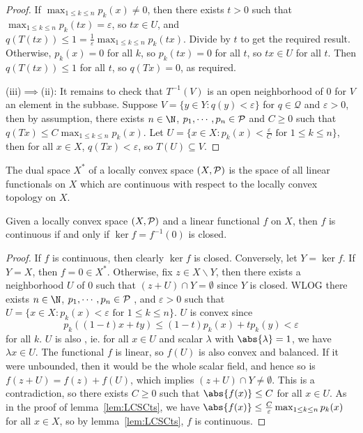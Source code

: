 \documentclass[a4paper]{article}
\begin{document}
{\begin{proof}
  If $\max_{1\leq k\leq n}p_k(x)\not= 0$, then there exists $t>0$ such that $\max_{1\leq k\leq n}p_k(tx)=\varepsilon$, so $tx\in U$, and $q(T(tx))\leq 1=\frac{1}{\varepsilon}\max_{1\leq k\leq n}p_k(tx)$. Divide by $t$ to get the required result. Otherwise, $p_k(x)=0$ for all $k$, so $p_k(tx)=0$ for all $t$, so $tx\in U$ for all $t$. Then $q(T(tx))\leq 1$ for all $t$, so $q(Tx)=0$, as required.

  (iii)$\implies$(ii): It remains to check that $T^{-1}(V)$ is an open neighborhood of 0 for $V$ an element in the subbase. Suppose $V=\{y\in Y: q(y)<\varepsilon\}$ for $q\in\mathcal{Q}$ and $\varepsilon>0$, then by assumption, there exists $n\in\N$, $p_1,\cdots,p_n\in\P$ and $C\geq 0$ such that $q(Tx)\leq C\max_{1\leq k\leq n}p_k(x)$. Let $U=\{x\in X:p_k(x)<\frac{\varepsilon}{C}\text{ for }1\leq k\leq n\}$, then for all $x\in X$, $q(Tx)<\varepsilon$, so $T(U)\subseteq V$.
\end{proof}

The dual space $X^*$ of a locally convex space $(X,\P)$ is the space of all linear functionals on $X$ which are continuous with respect to the locally convex topology on $X$.

\begin{ncor}\label{cor:KernelClosed}
  Given a locally convex space $(X,\P)$ and a linear functional $f$ on $X$, then $f$ is continuous if and only if $\ker f=f^{-1}(0)$ is closed.
\end{ncor}

\begin{proof}
	If $f$ is continuous, then clearly $\ker f$ is closed. Conversely, let $Y=\ker f$. If $Y=X$, then $f=0\in X^*$. Otherwise, fix $z\in X\backslash Y$, then there exists a neighborhood $U$ of 0 such that $(z+U)\cap Y=\emptyset$ since $Y$ is closed. WLOG there exists $n\in\N$, $p_1,\cdots,p_n\in\P$ , and $\varepsilon>0$ such that $U=\{x\in X:p_k(x)<\varepsilon\text{ for }1\leq k\leq n\}$. $U$ is convex since
	\[
	 p_k((1-t)x+ty)\leq (1-t)p_k(x)+tp_k(y)<\varepsilon
	\]
	for all $k$. $U$ is also , ie. for all $x\in U$ and scalar $\lambda$ with $\abs{\lambda}=1$, we have $\lambda x\in U$. The functional $f$ is linear, so $f(U)$ is also convex and balanced. If it were unbounded, then it would be the whole scalar field, and hence so is $f(z+U)=f(z)+f(U)$, which implies $(z+U)\cap Y\not=\emptyset$. This is a contradiction, so there exists $C\geq 0$ such that $\abs{f(x)}\leq C$ for all $x\in U$. As in the proof of lemma~\ref{lem:LCSCts}, we have $\abs{f(x)}\leq\frac{C}{\varepsilon}\max_{1\leq k\leq n}p_k(x)$ for all $x\in X$, so by lemma~\ref{lem:LCSCts}, $f$ is continuous.
\end{proof}

}
\end{document}
